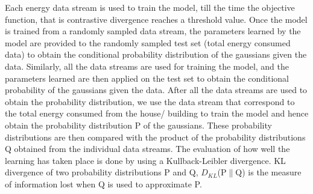 \documentclass[runningheads,a4paper]{llncs}
\begin{document}
Each energy data stream is used to train the model, till the time the objective function, that is contrastive divergence reaches a threshold value. Once the model is trained from a randomly sampled data stream, the parameters learned by the model %
are provided to the randomly sampled test set (total energy consumed data) to obtain the conditional probability distribution of the gaussians given the data. Similarly, all the data streams are used for training the model, and the parameters learned are then applied on the test set to obtain the conditional probability of the gaussians given the data. After all the data streams are used to obtain the probability distribution, we use the data stream that correspond to the total energy consumed from the house/ building to train the model and hence obtain the probability distribution P of the gaussians. These probability distributions are then compared with the product of the probability distributions Q obtained from the individual data streams. The evaluation of how well the learning has taken place is done by using a Kullback-Leibler divergence. KL divergence of two probability distributions P and Q, $D_{KL}$(P$\parallel$Q) is the measure of information lost when Q is used to approximate P. %


\end{document}
